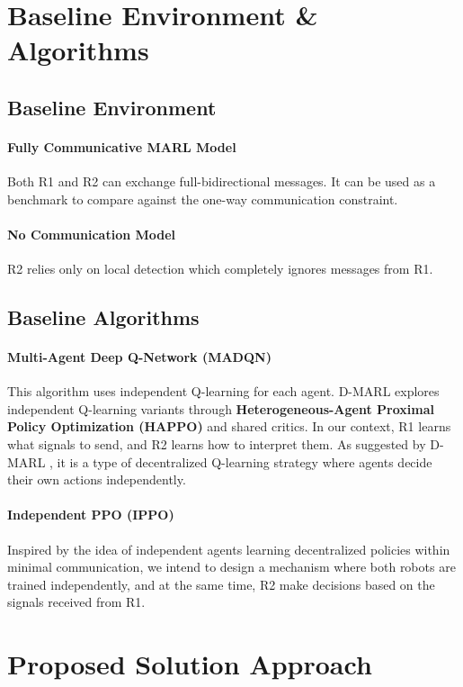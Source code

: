 \documentclass[a4paper,11pt]{article}
\begin{document}
\section{Baseline Environment \& Algorithms}

\subsection{Baseline Environment} 
\paragraph{Fully Communicative MARL Model} Both R1 and R2 can exchange full-bidirectional messages. It can be used as a benchmark to compare against the one-way communication constraint.

\paragraph{No Communication Model} R2 relies only on local detection which completely ignores messages from R1.

\subsection{Baseline Algorithms} 
\paragraph{Multi-Agent Deep Q-Network (MADQN)} This algorithm uses independent Q-learning for each agent. D-MARL \cite{D-MARL} explores independent Q-learning variants through \textbf{Heterogeneous-Agent Proximal Policy Optimization (HAPPO)} and shared critics.  In our context, R1 learns what signals to send, and R2 learns how to interpret them.
As suggested by D-MARL \cite{D-MARL}, it is a type of decentralized Q-learning strategy where agents decide their own actions independently.

\paragraph{Independent PPO (IPPO)} Inspired by the idea of independent agents \cite{D-MARL} learning decentralized policies within minimal communication, we intend to design a mechanism where both robots are trained independently, and at the same time, R2 make decisions based on the signals received from R1.

\section{Proposed Solution Approach}
\end{document}
